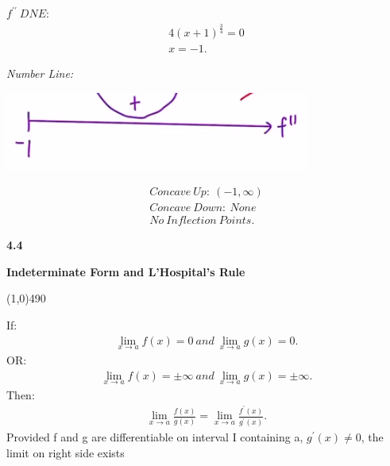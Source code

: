 \documentclass{report}
\begin{document}
  \bigbreak \noindent 
  \textit{$f^{\prime\prime}\ DNE $}:
  \begin{align*}
    4(x+1)^{\frac{3}{4}} = 0 \\
    x= -1
  .\end{align*}

  \bigbreak \noindent 

  \bigbreak \noindent 
  \textit{Number Line:}

  \bigbreak \noindent 
  \begin{center}
    \includegraphics[scale=1]{ ./images/7.png }
  \end{center}

  \bigbreak \noindent 
  \begin{align*}
    Concave\ Up:\ (-1,\infty) \\
    Concave\ Down:\ None \\
    No\ Inflection\ Points
  .\end{align*}


  \pagebreak \bigbreak \noindent
  \begin{Large}
      \begin{mdframed}
          \begin{center}
              \textbf{4.4}
          \end{center}
      \end{mdframed}
  \end{Large}
  \begin{Large}
      \begin{center}
          \textbf{Indeterminate Form and L'Hospital's Rule}
      \end{center}
  \end{Large}
  \line(1,0){490}
  
  \bigbreak \noindent 
  \begin{mdframed}
    \bigbreak \noindent 
    If:
    \begin{align*}
      \lim_{x \to a}{f(x) = 0}\ and\ \lim_{x \to a}{g(x) = 0} 
    .\end{align*}
    \bigbreak \noindent 
    OR:
    \begin{align*}
      \lim_{x \to a}{f(x)= \pm \infty}\ and\ \lim_{x \to a}{g(x) = \pm \infty}
    .\end{align*}
    \bigbreak \noindent 
    Then:
    \begin{align*}
      \lim_{x \to a}{\frac{f(x)}{g(x)}} = \lim_{x \to a}{\frac{f^{\prime}(x)}{g^{\prime}(x)}}   
    .\end{align*}
    \bigbreak \noindent 
    Provided f and g are differentiable on interval I containing a, $g^{\prime}(x) \neq 0$, the limit on right side exists
  \end{mdframed}
  
\end{document}
